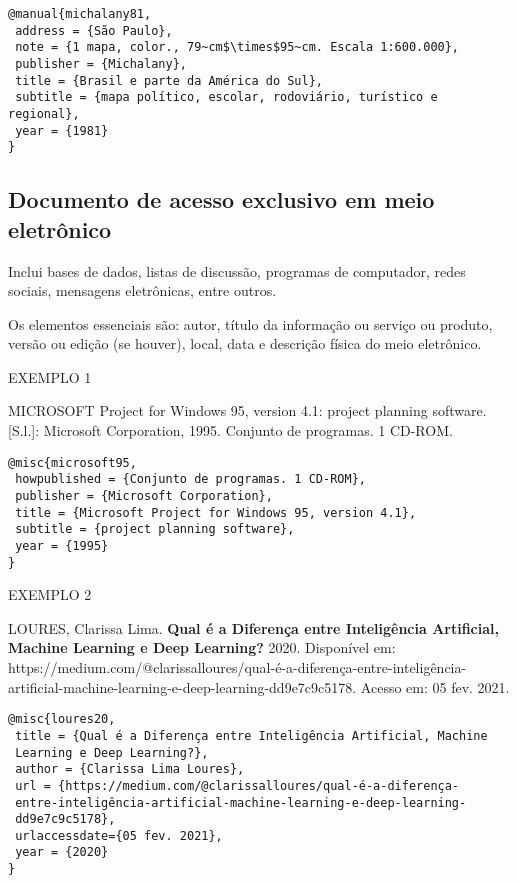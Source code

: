 \begin{verbatim}
@manual{michalany81,
 address = {São Paulo},
 note = {1 mapa, color., 79~cm$\times$95~cm. Escala 1:600.000},
 publisher = {Michalany},
 title = {Brasil e parte da América do Sul},
 subtitle = {mapa político, escolar, rodoviário, turístico e regional},
 year = {1981}
}
\end{verbatim}

\subsection{Documento de acesso exclusivo em meio eletrônico}

Inclui bases de dados, listas de discussão, programas de computador, redes sociais, mensagens eletrônicas, entre outros.

Os elementos essenciais são: autor, título da informação ou serviço ou produto, versão ou edição (se houver), local, data e descrição física do meio eletrônico.

EXEMPLO 1 

MICROSOFT Project for Windows 95, version 4.1: project planning software. [S.l.]: Microsoft Corporation, 1995. Conjunto de programas. 1 CD-ROM.

\begin{verbatim}
@misc{microsoft95,
 howpublished = {Conjunto de programas. 1 CD-ROM},
 publisher = {Microsoft Corporation},
 title = {Microsoft Project for Windows 95, version 4.1},
 subtitle = {project planning software},
 year = {1995}
}
\end{verbatim}

EXEMPLO 2 

LOURES, Clarissa Lima. \textbf{Qual é a Diferença entre Inteligência Artificial, Machine Learning e Deep Learning?} 2020. Disponível em: https://medium.com/@clarissalloures/qual-é-a-diferença-entre-inteligência-artificial-machine-learning-e-deep-learning-dd9e7c9c5178. Acesso em: 05 fev. 2021.

\begin{verbatim}
@misc{loures20,
 title = {Qual é a Diferença entre Inteligência Artificial, Machine
 Learning e Deep Learning?},
 author = {Clarissa Lima Loures},
 url = {https://medium.com/@clarissalloures/qual-é-a-diferença-
 entre-inteligência-artificial-machine-learning-e-deep-learning-
 dd9e7c9c5178},
 urlaccessdate={05 fev. 2021},
 year = {2020}
}
\end{verbatim}
